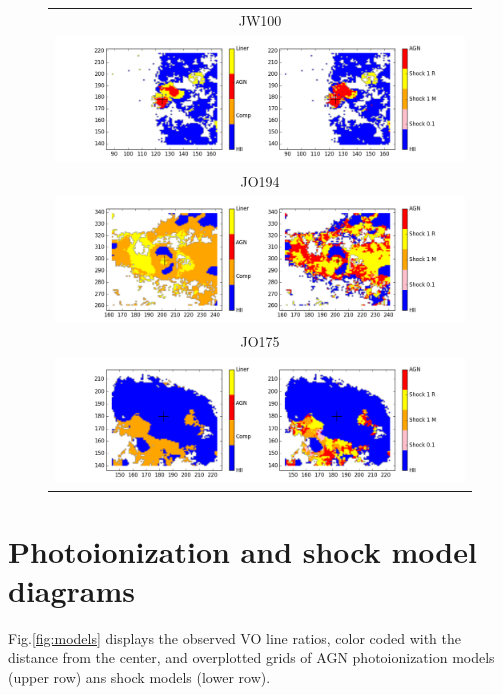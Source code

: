 \documentclass[fleqn,usenatbib]{mnras}
\begin{document}
\begin{figure}
	\begin{tabular}{c}	
		JW100 \\ \includegraphics[width=.95\linewidth]{Plots/JW100_NB_xbest_grid.png}\\
		JO194 \\	\includegraphics[width=.95\linewidth]{Plots/JO194_NB_xbest_grid.png}\\
		JO175 \\	\includegraphics[width=.95\linewidth]{Plots/JO175_NB_xbest_grid.png}\\	
	\end{tabular} 
	\contcaption{}
\end{figure}


\section{Photoionization and shock model diagrams}
\label{app:VO_diagram}

Fig.\ref{fig:models} displays the observed VO line ratios, color coded with the distance from the center, and overplotted grids of AGN photoionization models (upper row) ans shock models (lower row).
\end{document}
